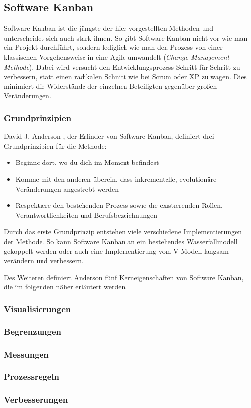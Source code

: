\subsection{Software Kanban}
Software Kanban ist die jüngste der hier vorgestellten Methoden und unterscheidet sich auch stark ihnen. So gibt Software Kanban nicht vor wie man ein Projekt durchführt, sondern lediglich wie man den Prozess von einer klassischen Vorgehensweise in eine Agile umwandelt (\emph{Change Management Methode}). Dabei wird versucht den Entwicklungsprozess Schritt für Schritt zu verbessern, statt einen radikalen Schnitt wie bei Scrum oder XP zu wagen. Dies minimiert die Widerstände der einzelnen Beteiligten gegenüber großen Veränderungen. 

\subsubsection{Grundprinzipien}
David J. Anderson \cite{bib:anderson}, der Erfinder von Software Kanban, definiert drei Grundprinzipien für die Methode:
\begin{itemize}
  \item Beginne dort, wo du dich im Moment befindest
  \item Komme mit den anderen überein, dass inkrementelle, evolutionäre Veränderungen angestrebt werden
  \item Respektiere den bestehenden Prozess sowie die existierenden Rollen, Verantwortlichkeiten und Berufsbezeichnungen
\end{itemize}

Durch das erste Grundprinzip entstehen viele verschiedene Implementierungen der Methode. So kann Software Kanban an ein bestehendes Wasserfallmodell gekoppelt werden oder auch eine Implementierung vom V-Modell langsam verändern und verbessern.

Des Weiteren definiert Anderson fünf Kerneigenschaften von Software Kanban, die im folgenden näher erläutert werden.

\subsubsection{Visualisierungen}
\subsubsection{Begrenzungen}
\subsubsection{Messungen}
\subsubsection{Prozessregeln}
\subsubsection{Verbesserungen}
